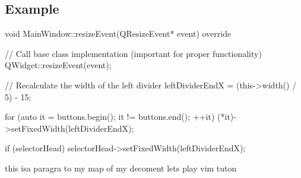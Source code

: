 \documentclass{report}
\begin{document}
    \subsection{Example}
    \bigbreak \noindent 
    \begin{cppcode}
void MainWindow::resizeEvent(QResizeEvent* event) override {
    // Call base class implementation (important for proper functionality)
    QWidget::resizeEvent(event);

    // Recalculate the width of the left divider
    leftDividerEndX = (this->width() / 5) - 15;

    for (auto it = buttons.begin(); it != buttons.end(); ++it) {
        (*it)->setFixedWidth(leftDividerEndX);
    }

    if (selectorHead) {
        selectorHead->setFixedWidth(leftDividerEndX);
    }
}

    \end{cppcode}
    
    this isa  paragra to my map of my decoment lets play vim tuton 





    







    
    
\end{document}
